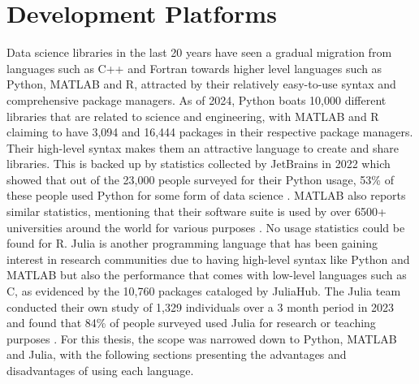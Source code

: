 \section{Development Platforms}
Data science libraries in the last 20 years have seen a gradual migration from languages such as C++ and Fortran towards
higher level languages such as Python, MATLAB and R, attracted by their relatively easy-to-use syntax and comprehensive
package managers. As of 2024, Python boats 10,000 different libraries that are related to science and engineering, with
MATLAB and R claiming to have 3,094 and 16,444 packages in their respective package managers. Their high-level syntax
makes them an attractive language to create and share libraries. This is backed up by statistics collected by JetBrains
in 2022 which showed that out of the 23,000 people surveyed for their Python usage, 53\% of these people used Python for
some form of data science \cite{PythonDevelopersSurvey}. MATLAB also reports similar statistics, mentioning that their
software suite is used by over 6500+ universities around the world for various purposes \cite{MATLABAcademia}. No usage
statistics could be found for R. Julia is another programming language that has been gaining interest in research
communities due to having high-level syntax like Python and MATLAB but also the performance that comes with low-level
languages such as C, as evidenced by the 10,760 packages cataloged by JuliaHub. The Julia team conducted their own study
of 1,329 individuals over a 3 month period in 2023 and found that 84\% of people surveyed used Julia for research or
teaching purposes \cite{clasterJuliaUserDeveloper}. For this thesis, the scope was narrowed down to Python, MATLAB and
Julia, with the following sections presenting the advantages and disadvantages of using each language.

